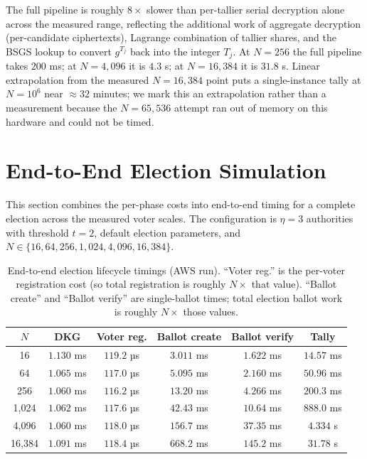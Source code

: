 \documentclass[12pt,a4paper,oneside]{report}
\begin{document}
The full pipeline is roughly $8\times$ slower than per-tallier serial
decryption alone across the measured range, reflecting the additional
work of aggregate decryption (per-candidate ciphertexts), Lagrange
combination of tallier shares, and the BSGS lookup to convert
$g^{T_j}$ back into the integer $T_j$. At $N = 256$ the full pipeline
takes $200$ ms; at $N = 4{,}096$ it is $4.3$ s; at $N = 16{,}384$ it
is $31.8$ s. Linear extrapolation from the measured $N = 16{,}384$
point puts a single-instance tally at $N = 10^6$ near $\approx 32$
minutes; we mark this an extrapolation rather than a measurement
because the $N = 65{,}536$ attempt ran out of memory on this hardware
and could not be timed.

\section{End-to-End Election Simulation}
\label{sec:bench-lifecycle}

This section combines the per-phase costs into end-to-end timing for a
complete election across the measured voter scales. The configuration
is $\eta = 3$ authorities with threshold $t = 2$, default election
parameters, and $N \in \{16, 64, 256, 1{,}024, 4{,}096, 16{,}384\}$.

\begin{table}[H]
\centering
\caption{End-to-end election lifecycle timings (AWS run). ``Voter reg.''
is the per-voter registration cost (so total registration is roughly
$N \times$ that value). ``Ballot create'' and ``Ballot verify'' are
single-ballot times; total election ballot work is roughly
$N \times$ those values.}
\label{tab:bench-lifecycle}
\small
\begin{tabular}{cccccc}
\toprule
$N$ & DKG & Voter reg. & Ballot create & Ballot verify & Tally \\
\midrule
16       & $1.130$ ms & $119.2$ µs & $3.011$ ms & $1.622$ ms & $14.57$ ms \\
64       & $1.065$ ms & $117.0$ µs & $5.095$ ms & $2.160$ ms & $50.96$ ms \\
256      & $1.060$ ms & $116.2$ µs & $13.20$ ms & $4.266$ ms & $200.3$ ms \\
1{,}024  & $1.062$ ms & $117.6$ µs & $42.43$ ms & $10.64$ ms & $888.0$ ms \\
4{,}096  & $1.060$ ms & $118.0$ µs & $156.7$ ms & $37.35$ ms & $4.334$ s \\
16{,}384 & $1.091$ ms & $118.4$ µs & $668.2$ ms & $145.2$ ms & $31.78$ s \\
\bottomrule
\end{tabular}
\end{table}
\end{document}
